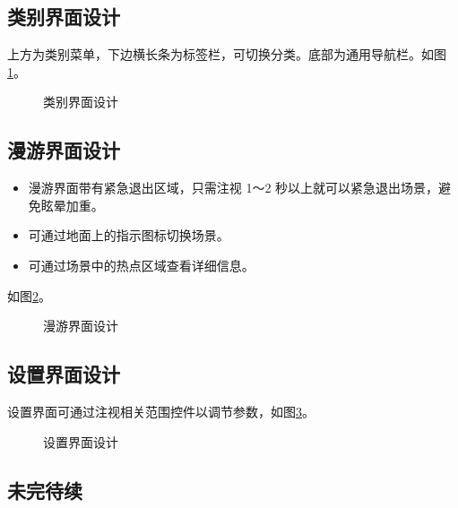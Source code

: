 \subsection{类别界面设计}
上方为类别菜单，下边横长条为标签栏，可切换分类。底部为通用导航栏。如图\ref{fig:menu}。

\begin{figure}[htp]
\centering
{}
\caption{类别界面设计}
\label{fig:menu}
\end{figure}

\subsection{漫游界面设计}
\begin{itemize}
	\item 漫游界面带有紧急退出区域，只需注视 1～2 秒以上就可以紧急退出场景，避免眩晕加重。
	\item 可通过地面上的指示图标切换场景。
	\item 可通过场景中的热点区域查看详细信息。
\end{itemize}
如图\ref{fig:scenery}。

\begin{figure}[htp]
\centering
{}
\caption{漫游界面设计}
\label{fig:scenery}
\end{figure}

\subsection{设置界面设计}
设置界面可通过注视相关范围控件以调节参数，如图\ref{fig:setting}。

\begin{figure}[htp]
\centering
{}
\caption{设置界面设计}
\label{fig:setting}
\end{figure}

\subsection{未完待续}
